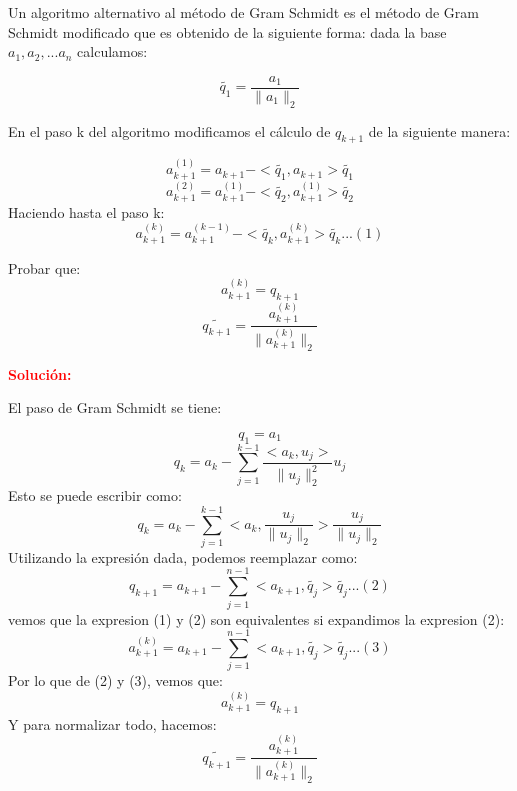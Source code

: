 Un  algoritmo  alternativo  al  método  de  Gram  Schmidt  es  el  método  de  Gram  Schmidt  modificado  que  es  obtenido  de  la  siguiente  forma:  dada  la  base  $a_1, a_2, ... a_n$ calculamos:

$$
  \widetilde{q_1} = \frac{a_1}{\|a_1\|_2}
$$

En el paso k del algoritmo modificamos el cálculo de $q_{k+1}$ de la siguiente manera:

$$
  a_{k+1}^{(1)} = a_{k+1} - <\widetilde{q_1}, a_{k+1}> \widetilde{q_1}
$$
$$
  a_{k+1}^{(2)} = a_{k+1}^{(1)} - <\widetilde{q_2}, a_{k+1}^{(1)}> \widetilde{q_2}
$$
Haciendo hasta el paso k:
$$
  a_{k+1}^{(k)} = a_{k+1}^{(k-1)} - <\widetilde{q_k}, a_{k+1}^{(k)}> \widetilde{q_k} ...(1)
$$

Probar que:
$$
  a_{k+1}^{(k)} = q_{k+1}
$$
$$
  \widetilde{q_{k+1}} = \frac{a_{k+1}^{(k)}}{\|a_{k+1}^{(k)}\|_2}
$$

\noindent \textcolor{red}{\bf Solución:}

El paso de Gram Schmidt se tiene:

$$
  q_1 = a_1
$$
$$
  q_k = a_k - \sum_{j=1}^{k-1} \frac{<a_k,u_j>}{\|u_j\|_2^2} u_j
$$
Esto se puede escribir como:
$$
  q_k = a_k - \sum_{j=1}^{k-1} <a_k,\frac{u_j}{\|u_j\|_2}> \frac{u_j}{\|u_j\|_2}
$$
Utilizando la expresión dada, podemos reemplazar como:
$$
  q_{k+1} = a_{k+1} - \sum_{j=1}^{n-1} <a_{k+1},\widetilde{q_{j}}> \widetilde{q_{j}} ...(2)
$$
vemos que la expresion (1) y (2) son equivalentes si expandimos la expresion (2):
$$
  a_{k+1}^{(k)} = a_{k+1} - \sum_{j=1}^{n-1} <a_{k+1},\widetilde{q_{j}}> \widetilde{q_{j}} ...(3)
$$
Por lo que de (2) y (3), vemos que:
$$
  a_{k+1}^{(k)} = q_{k+1}
$$
Y para normalizar todo, hacemos:
$$
  \widetilde{q_{k+1}} = \frac{a_{k+1}^{(k)}}{\|a_{k+1}^{(k)}\|_2}
$$